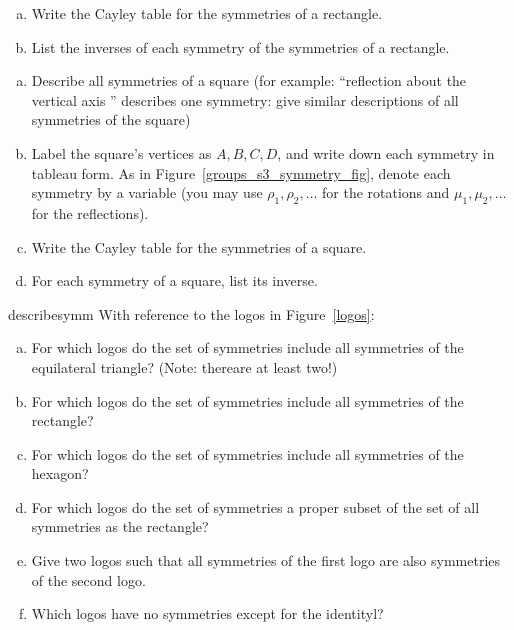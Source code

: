 \bigskip
\begin{exercise}{}
\begin{enumerate}[(a)]
\item
Write the Cayley table for the symmetries of a rectangle.
\item
List the inverses of each symmetry of the symmetries of a rectangle.
\end{enumerate}
\end{exercise}

\begin{exercise}{}
\begin{enumerate}[(a)]
\item
Describe all symmetries of a square  (for example: ``reflection about the vertical axis '' describes one symmetry: give similar descriptions of all symmetries of the square)
\item
Label the square's vertices as $A, B, C, D$, and write down each symmetry in tableau form. As in Figure~\ref{groups_s3_symmetry_fig}, denote each symmetry by a variable (you may use $\rho_1, \rho_2, \ldots$ for the rotations and $\mu_1, \mu_2, \ldots$ for the reflections).
\item
Write the Cayley table for the symmetries of a square.
\item
For each symmetry of a square, list its inverse.
\end{enumerate}
\end{exercise}

\begin{exercise}{describesymm}
With reference to the logos in Figure~\ref{logos}:
\begin{enumerate}[(a)]
\item
For which logos do the set of symmetries include all symmetries of the equilateral triangle? (Note: thereare at least two!)
\item
For which logos do the set of symmetries include all symmetries of the rectangle?
\item
For which logos do the set of symmetries include all symmetries of the hexagon?
\item
For which logos do the set of symmetries a proper subset of the set of all symmetries as the rectangle?
\item
Give two logos such that all symmetries of the first logo are also symmetries of the second logo.
\item
Which logos have no symmetries except for the identityl?
\end{enumerate}
\end{exercise}  

